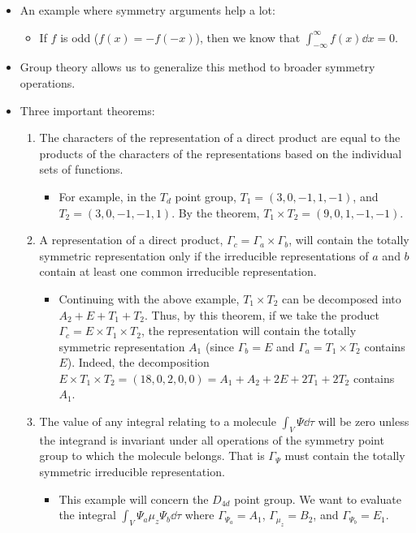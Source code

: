 \documentclass[../notes.tex]{subfiles}
\begin{document}
\begin{itemize}
\begin{itemize}
    \end{itemize}
    \item An example where symmetry arguments help a lot:
    \begin{itemize}
        \item If $f$ is odd ($f(x)=-f(-x)$), then we know that $\int_{-\infty}^\infty f(x)\dd{x}=0$.
    \end{itemize}
    \item Group theory allows us to generalize this method to broader symmetry operations.
    \item Three important theorems:
    \begin{enumerate}
        \item The characters of the representation of a direct product are equal to the products of the characters of the representations based on the individual sets of functions.
        \begin{itemize}
            \item For example, in the $T_d$ point group, $T_1=(3,0,-1,1,-1)$, and $T_2=(3,0,-1,-1,1)$. By the theorem, $T_1\times T_2=(9,0,1,-1,-1)$.
        \end{itemize}
        \item A representation of a direct product, $\Gamma_c=\Gamma_a\times\Gamma_b$, will contain the totally symmetric representation only if the irreducible representations of $a$ and $b$ contain at least one common irreducible representation.
        \begin{itemize}
            \item Continuing with the above example, $T_1\times T_2$ can be decomposed into $A_2+E+T_1+T_2$. Thus, by this theorem, if we take the product $\Gamma_c=E\times T_1\times T_2$, the representation will contain the totally symmetric representation $A_1$ (since $\Gamma_b=E$ and $\Gamma_a=T_1\times T_2$ contains $E$). Indeed, the decomposition $E\times T_1\times T_2=(18,0,2,0,0)=A_1+A_2+2E+2T_1+2T_2$ contains $A_1$.
        \end{itemize}
        \item The value of any integral relating to a molecule $\int_V\Psi\dd{\tau}$ will be zero unless the integrand is invariant under all operations of the symmetry point group to which the molecule belongs. That is $\Gamma_\Psi$ must contain the totally symmetric irreducible representation.
        \begin{itemize}
            \item This example will concern the $D_{4d}$ point group. We want to evaluate the integral $\int_V\Psi_a\mu_z\Psi_b\dd{\tau}$ where $\Gamma_{\Psi_a}=A_1$, $\Gamma_{\mu_z}=B_2$, and $\Gamma_{\Psi_b}=E_1$.

\end{itemize}
\end{enumerate}
\end{itemize}
\end{document}
